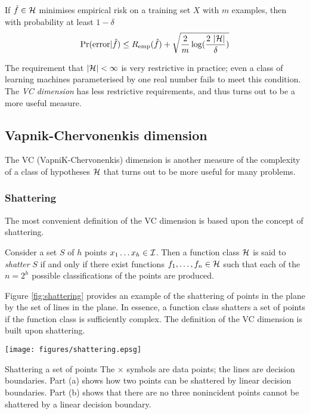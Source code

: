 \begin{theorem}
If $\hat{f} \in \mathcal{H}$ minimises empirical risk on a training set $X$
with $m$ examples, then with probability at least $1 - \delta$
%
\begin{equation}
\Pr(\mathrm{error}|\hat{f}) \leq R_{\mathrm{emp}}(\hat{f}) + \sqrt{\frac{2}{m}
\log (\frac{2\  |\mathcal{H}|}{\delta})}
\end{equation}
\end{theorem}

The requirement that $|\mathcal{H}| < \infty$ is very restrictive in
practice; even a class of learning machines parameterised by one real
number fails to meet this condition.  The \emph{VC dimension} has less
restrictive requirements, and thus turns out to be a more useful measure.


\subsection{Vapnik-Chervonenkis dimension}
\label{acr:vcdim}

The VC (VapniK-Chervonenkis) dimension is another measure of the complexity
of a class of hypotheses $\mathcal{H}$ that turns out to be more useful for
many problems.

\subsubsection{Shattering}

The most convenient definition of the VC dimension is based upon the
concept of shattering.

\begin{definition}[Shattering]
Consider a set $S$ of $h$ points $x_1 \ldots x_h \in \mathcal{I}$.  Then a
function class $\mathcal{H}$ is said to \emph{shatter} $S$ if and only if
there exist functions $f_1, \ldots, f_n \in \mathcal{H}$ such that each of
the $n = 2^h$ possible classifications of the points are produced.
\end{definition}

Figure \ref{fig:shattering} provides an example of the shattering of
points in the plane by the set of lines in the plane.  In essence, a
function class shatters a set of points if the function class is
sufficiently complex.  The definition of the VC dimension is built
upon shattering.

\begin{linefigure}
\begin{center}
\texttt{[image: figures/shattering.epsg]}
\end{center}
\label{fig:shattering}
\begin{capt}{Shattering a set of points}
The $\times$ symbols are data points; the lines are decision boundaries.
Part (a) shows how two points can be shattered by linear decision
boundaries.  Part (b) shows that there are no three nonincident points
cannot be shattered by a linear decision boundary.
\end{capt}
\end{linefigure}


